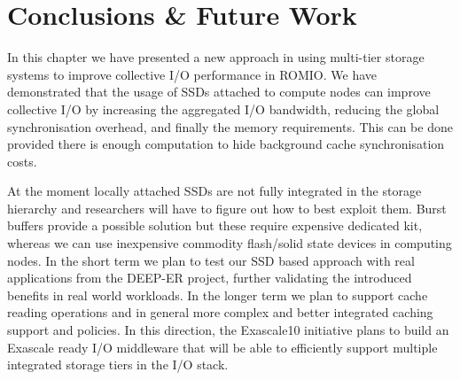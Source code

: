 \section{Conclusions \& Future Work}
\label{sec: conclusion}

In this chapter we have presented a new approach in using multi-tier storage systems to improve collective I/O performance in ROMIO. We have demonstrated that the usage of SSDs attached to compute nodes can improve collective I/O by increasing the aggregated I/O bandwidth, reducing the global synchronisation overhead, and finally the memory requirements. This can be done provided there is enough computation to hide background cache synchronisation costs.

At the moment locally attached SSDs are not fully integrated in the storage hierarchy and researchers will have to figure out how to best exploit them. Burst buffers provide a possible solution but these require expensive dedicated kit, whereas we can use inexpensive commodity flash/solid state devices in computing nodes. In the short term we plan to test our SSD based approach with real applications from the DEEP-ER project, further validating the introduced benefits in real world workloads. In the longer term we plan to support cache reading operations and in general more complex and better integrated caching support and policies. In this direction, the Exascale10 initiative plans to build an Exascale ready I/O middleware that will be able to efficiently support multiple integrated storage tiers in the I/O stack.
